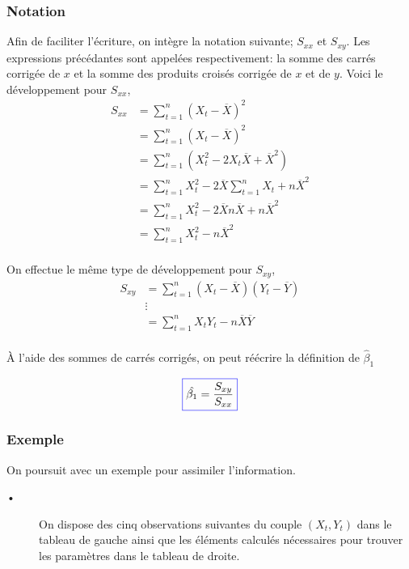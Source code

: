 \documentclass[11pt,french]{report}
\begin{document}
\subsubsection*{Notation}
Afin de faciliter l'écriture, on intègre la notation suivante; $S_{xx}$ et  $S_{xy}$. Les expressions précédantes sont appelées respectivement: la somme des carrés corrigée de $x$ et la somme des produits croisés corrigée de $x$ et de $y$.
Voici le développement pour $S_{xx}$,
\begin{align*}
S_{xx} &= \sum_{t=1}^n (X_t - \overline{X})^2 \\
&= \sum_{t=1}^n (X_t - \overline{X})^2 \\
&= \sum_{t=1}^n (X_t^2 - 2X_t\overline{X} + \overline{X}^2) \\
&= \sum_{t=1}^n X_t^2 - 2\overline{X}\sum_{t=1}^n X_t + n\overline{X}^2 \\
&= \sum_{t=1}^n X_t^2 - 2\overline{X}n\overline{X} + n\overline{X}^2 \\
&= \sum_{t=1}^n X_t^2 - n\overline{X}^2 \\
\end{align*}

On effectue le même type de développement pour $S_{xy}$, 
\begin{align*}
S_{xy} &= \sum_{t=1}^n (X_t - \overline{X}) (Y_t - \overline{Y}) \\
&\vdots \\
&= \sum_{t=1}^n X_tY_t - n\overline{X}\overline{Y}\\
\end{align*}

À l'aide des sommes de carrés corrigés, on peut réécrire la définition de $\hat{\beta}_1$

\begin{equation}
\label{eq:beta1SXY}
\color{blue}
\boxed{\color{black}
\hat{\beta_1} = \frac{S_{xy}}{S_{xx}}
}
\end{equation}

\bigskip
\subsubsection*{Exemple}
\label{exemple1}
On poursuit avec un exemple pour assimiler l'information.

\bigskip
\begin{description}
\item[•] On dispose des cinq observations suivantes du couple $(X_t, Y_t)$ dans le tableau de gauche ainsi que les éléments calculés nécessaires pour trouver les paramètres dans le tableau de droite.
\end{description}
\end{document}
